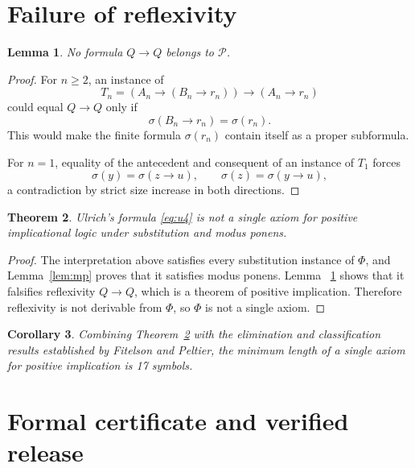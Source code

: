 \documentclass[11pt]{article}
\newtheorem{theorem}{Theorem}
\newtheorem{lemma}[theorem]{Lemma}
\newtheorem{corollary}[theorem]{Corollary}
\newcommand{\Imp}{\mathbin{\to}}
\begin{document}
\section{\hspace{0.35em}Failure of reflexivity}

\begin{lemma}\label{lem:refl}
No formula $Q\Imp Q$ belongs to $\mathcal P$.
\end{lemma}

\begin{proof}
For $n\ge2$, an instance of
\[
T_n=(A_n\Imp(B_n\Imp r_n))\Imp(A_n\Imp r_n)
\]
could equal $Q\Imp Q$ only if
\[
\sigma(B_n\Imp r_n)=\sigma(r_n).
\]
This would make the finite formula $\sigma(r_n)$ contain itself as a
proper subformula.

For $n=1$, equality of the antecedent and consequent of an instance of
$T_1$ forces
\[
\sigma(y)=\sigma(z\Imp u),\qquad
\sigma(z)=\sigma(y\Imp u),
\]
a contradiction by strict size increase in both directions.
\end{proof}

\begin{theorem}\label{thm:main}
Ulrich's formula \eqref{eq:u4} is not a single axiom for positive
implicational logic under substitution and modus ponens.
\end{theorem}

\begin{proof}
The interpretation above satisfies every substitution instance of $\Phi$,
and Lemma~\ref{lem:mp} proves that it satisfies modus ponens.  Lemma~
\ref{lem:refl} shows that it falsifies reflexivity $Q\Imp Q$, which is a
theorem of positive implication.  Therefore reflexivity is not derivable
from $\Phi$, so $\Phi$ is not a single axiom.
\end{proof}

\begin{corollary}
Combining Theorem~\ref{thm:main} with the elimination and classification
results established by Fitelson and Peltier, the minimum length of a single
axiom for positive implication is 17 symbols.
\end{corollary}

\section{Formal certificate and verified release}
\end{document}
